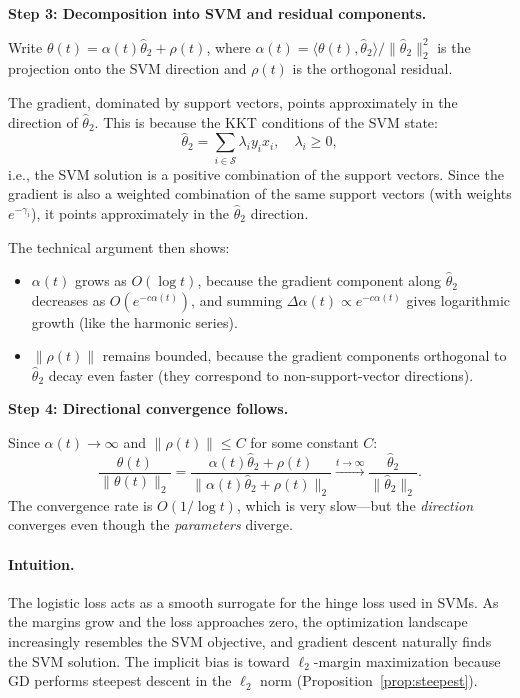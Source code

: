 \documentclass{article}
\begin{document}
\textbf{Step 3: Decomposition into SVM and residual components.}

Write $\theta(t) = \alpha(t) \hat{\theta}_2 + \rho(t)$, where $\alpha(t) = \langle \theta(t), \hat{\theta}_2 \rangle / \|\hat{\theta}_2\|_2^2$ is the projection onto the SVM direction and $\rho(t)$ is the orthogonal residual.

The gradient, dominated by support vectors, points approximately in the direction of $\hat{\theta}_2$. This is because the KKT conditions of the SVM state:
\begin{equation}
    \hat{\theta}_2 = \sum_{i \in \mathcal{S}} \lambda_i y_i x_i, \quad \lambda_i \geq 0,
\end{equation}
i.e., the SVM solution is a positive combination of the support vectors. Since the gradient is also a weighted combination of the same support vectors (with weights $e^{-\gamma_i}$), it points approximately in the $\hat{\theta}_2$ direction.

The technical argument then shows:
\begin{itemize}[leftmargin=*]
    \item $\alpha(t)$ grows as $O(\log t)$, because the gradient component along $\hat{\theta}_2$ decreases as $O(e^{-c\alpha(t)})$, and summing $\Delta\alpha(t) \propto e^{-c\alpha(t)}$ gives logarithmic growth (like the harmonic series).
    \item $\|\rho(t)\|$ remains bounded, because the gradient components orthogonal to $\hat{\theta}_2$ decay even faster (they correspond to non-support-vector directions).
\end{itemize}

\textbf{Step 4: Directional convergence follows.}

Since $\alpha(t) \to \infty$ and $\|\rho(t)\| \leq C$ for some constant $C$:
\begin{equation}
    \frac{\theta(t)}{\|\theta(t)\|_2} = \frac{\alpha(t) \hat{\theta}_2 + \rho(t)}{\|\alpha(t) \hat{\theta}_2 + \rho(t)\|_2} \xrightarrow{t \to \infty} \frac{\hat{\theta}_2}{\|\hat{\theta}_2\|_2}.
\end{equation}
The convergence rate is $O(1/\log t)$, which is very slow---but the \emph{direction} converges even though the \emph{parameters} diverge.

\paragraph{Intuition.} The logistic loss acts as a smooth surrogate for the hinge loss used in SVMs. As the margins grow and the loss approaches zero, the optimization landscape increasingly resembles the SVM objective, and gradient descent naturally finds the SVM solution. The implicit bias is toward $\ell_2$-margin maximization because GD performs steepest descent in the $\ell_2$ norm (Proposition~\ref{prop:steepest}).
\end{document}
